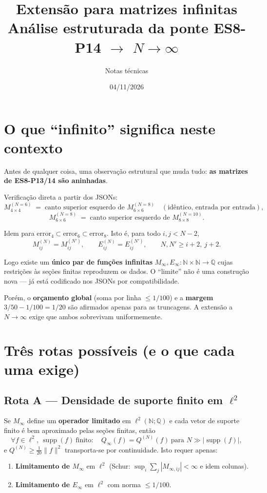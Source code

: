 \documentclass[11pt,a4paper]{article}
\title{Extensão para matrizes infinitas\\[2pt]
\large Análise estruturada da ponte ES8-P14 $\to$ $N\to\infty$}
\author{Notas técnicas}
\date{04/11/2026}
\theoremstyle{definition}
\theoremstyle{remark}
\newcommand{\Q}{\mathbb{Q}}
\newcommand{\N}{\mathbb{N}}
\newcommand{\lII}{\ell^2}
\newcommand{\supp}{\operatorname{supp}}
\newcommand{\qform}{Q}
\begin{document}
\maketitle

\tableofcontents

\section{O que ``infinito'' significa neste contexto}

Antes de qualquer coisa, uma observação estrutural que muda tudo:
\textbf{as matrizes de ES8-P13/14 são aninhadas}.

Verificação direta a partir dos JSONs:
\[
M^{(N=6)}_{4\times 4} \;=\; \text{canto superior esquerdo de } M^{(N=8)}_{6\times 6}
\quad(\text{idêntico, entrada por entrada}),
\]
\[
M^{(N=8)}_{6\times 6} \;=\; \text{canto superior esquerdo de } M^{(N=10)}_{8\times 8}.
\]

Idem para \(\mathrm{error}_4 \subset \mathrm{error}_6 \subset \mathrm{error}_8\). Isto é, para todo
\(i,j < N-2\),
\[
M^{(N)}_{ij} = M^{(N')}_{ij}, \qquad E^{(N)}_{ij} = E^{(N')}_{ij}, \qquad N,N' \ge i+2,\ j+2.
\]

Logo existe um \textbf{único par de funções infinitas}
\(M_\infty, E_\infty : \N\times\N \to \Q\)
cujas restrições às seções finitas reproduzem os dados. O ``limite'' não é uma
construção nova --- já está codificado nos JSONs por compatibilidade.

Porém, o \textbf{orçamento global} (soma por linha \(\le 1/100\)) e a
\textbf{margem} \(3/50 - 1/100 = 1/20\) são afirmados apenas para as truncagens.
A extensão a \(N\to\infty\) exige que ambos sobrevivam uniformemente.

\section{Três rotas possíveis (e o que cada uma exige)}

\subsection{Rota A --- Densidade de suporte finito em \(\lII\)}

Se \(M_\infty\) define um \textbf{operador limitado} em \(\lII(\N;\Q)\) e cada
vetor de suporte finito é bem aproximado pelas seções finitas, então
\[
\forall f \in \lII,\ \supp(f)\ \text{finito}:\quad
\qform_\infty(f) = \qform^{(N)}(f)\ \text{para } N \gg |\supp(f)|,
\]
e \(\qform^{(N)} \ge \tfrac{1}{20}\|f\|^2\) transporta-se por continuidade.
Isto requer apenas:
\begin{enumerate}[label=(\arabic*)]
  \item \textbf{Limitamento de \(M_\infty\)} em \(\lII\) (Schur:
        \(\sup_i\sum_j |M_{\infty,ij}| < \infty\) e idem colunas).
  \item \textbf{Limitamento de \(E_\infty\)} em \(\lII\) com norma \(\le 1/100\).
\end{enumerate}
\end{document}
